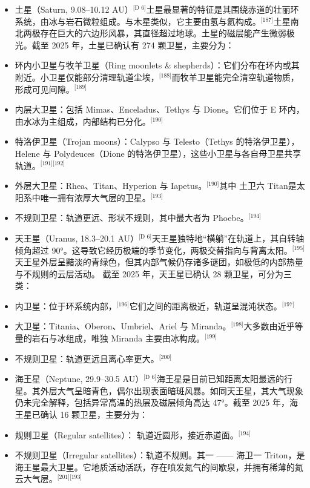 \begin{itemize}
\item 土星（Saturn, 9.08–10.12 AU）\(^\text{[D 6]}\)土星最显著的特征是其围绕赤道的壮丽环系统，由冰与岩石微粒组成。与木星类似，它主要由氢与氦构成。\(^\text{[187]}\)土星南北两极存在巨大的六边形风暴，其直径超过地球。土星的磁层能产生微弱极光。截至 2025 年，土星已确认有 274 颗卫星，主要分为：  
\item 环内小卫星与牧羊卫星（Ring moonlets & shepherds）：它们分布在环内或其附近。小卫星仅能部分清理轨道尘埃，\(^\text{[188]}\)而牧羊卫星能完全清空轨道物质，形成可见间隙。\(^\text{[189]}\)  
\item 内层大卫星：包括 Mimas、Enceladus、Tethys 与 Dione。它们位于 E 环内，由水冰为主组成，内部结构已分化。\(^\text{[190]}\)  
\item 特洛伊卫星（Trojan moons）：Calypso 与 Telesto（Tethys 的特洛伊卫星），Helene 与 Polydeuces（Dione 的特洛伊卫星），这些小卫星与各自母卫星共享轨道。\(^\text{[191][192]}\)  
\item 外层大卫星：Rhea、Titan、Hyperion 与 Iapetus。\(^\text{[190]}\)其中 土卫六 Titan是太阳系中唯一拥有浓厚大气层的卫星。\(^\text{[193]}\) 
\item 不规则卫星：轨道更远、形状不规则，其中最大者为 Phoebe。\(^\text{[194]}\) 
\end{itemize}
\begin{itemize}
\item 天王星（Uranus, 18.3–20.1 AU）\(^\text{[D 6]}\)天王星独特地“横躺”在轨道上，其自转轴倾角超过 90°。这导致它经历极端的季节变化，两极交替指向与背离太阳。\(^\text{[195]}\)天王星外层呈黯淡的青绿色，但其内部气候仍存诸多谜团，如极低的内部热量与不规则的云层活动。  
截至 2025 年，天王星已确认 28 颗卫星，可分为三类：  
\item 内卫星：位于环系统内部，\(^\text{[196]}\)它们之间的距离极近，轨道呈混沌状态。\(^\text{[197]}\)  
\item 大卫星：Titania、Oberon、Umbriel、Ariel 与 Miranda。\(^\text{[198]}\)大多数由近乎等量的岩石与冰组成，唯独 Miranda 主要由冰构成。\(^\text{[199]}\)  
\item 不规则卫星：轨道更远且离心率更大。\(^\text{[200]}\) 
\end{itemize}
\begin{itemize}
\item 海王星（Neptune, 29.9–30.5 AU）\(^\text{[D 6]}\)海王星是目前已知距离太阳最远的行星。其外层大气呈暗青色，偶尔出现表面暗斑风暴。如同天王星，其大气现象仍未完全解释，包括异常高温的热层及磁层倾角高达 47°。截至 2025 年，海王星已确认 16 颗卫星，主要分为：  
\item 规则卫星（Regular satellites）： 轨道近圆形，接近赤道面。\(^\text{[194]}\)  
\item 不规则卫星（Irregular satellites）：轨道不规则。其一 —— 海卫一 Triton，是海王星最大卫星。它地质活动活跃，存在喷发氮气的间歇泉，并拥有稀薄的氮云大气层。\(^\text{[201][193]}\)
\end{itemize}

